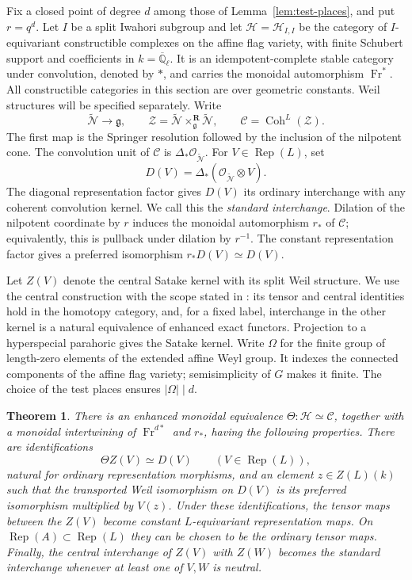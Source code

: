 \documentclass[11pt]{article}
\numberwithin{equation}{section}
\newtheorem{theorem}{Theorem}[section]
\theoremstyle{definition}
\theoremstyle{remark}
\newcommand{\Q}{\mathbb Q}
\newcommand{\g}{\mathfrak g}
\newcommand{\cO}{\mathcal O}
\newcommand{\cN}{\mathcal N}
\newcommand{\Fr}{\operatorname{Fr}}
\newcommand{\Rep}{\operatorname{Rep}}
\newcommand{\Coh}{\operatorname{Coh}}
\begin{document}
Fix a closed point of degree $d$ among those of
Lemma~\ref{lem:test-places}, and put $r=q^d$.
Let $I$ be a split Iwahori subgroup and let
$\mathscr H=\mathscr H_{I,I}$ be the category of $I$-equivariant
constructible complexes on the affine flag variety, with finite
Schubert support and coefficients in $k=\overline{\Q}_\ell$.
It is an idempotent-complete stable category under convolution, denoted
by $*$, and carries the monoidal automorphism $\Fr^*$.
All constructible categories in this section are over geometric
constants.  Weil structures will be specified separately.
Write
\[
 \widetilde{\cN}\longrightarrow\g,
 \qquad
 \mathcal Z=\widetilde{\cN}\mathbin{\times}^{\mathbf R}_{\g}
                     \widetilde{\cN},
 \qquad
 \mathscr C=\Coh^L(\mathcal Z).
\]
The first map is the Springer resolution followed by the inclusion of
the nilpotent cone.  The convolution unit of $\mathscr C$ is
$\Delta_*\cO_{\widetilde{\cN}}$.  For $V\in\Rep(L)$, set
\[
 D(V)=\Delta_*(\cO_{\widetilde{\cN}}\otimes V).
\]
The diagonal representation factor gives $D(V)$ its ordinary
interchange with any coherent convolution kernel.  We call this the
\emph{standard interchange}.  Dilation of the nilpotent coordinate by
$r$ induces the monoidal automorphism $r_*$ of $\mathscr C$; equivalently,
this is pullback under dilation by $r^{-1}$.  The constant representation
factor gives a preferred isomorphism $r_*D(V)\simeq D(V)$.

Let $Z(V)$ denote the central Satake kernel with its split Weil
structure.  We use the central construction with the scope stated in
\cite[Section~2, ``Central and Wakimoto kernels'']{Parent}: its tensor
and central identities hold in the homotopy category, and, for a fixed
label, interchange in the other kernel is a natural equivalence of
enhanced exact functors.  Projection to a hyperspecial parahoric gives
the Satake kernel.  Write $\Omega$ for the finite group of length-zero
elements of the extended affine Weyl group.  It indexes the connected
components of the affine flag variety; semisimplicity of $G$ makes it
finite.  The choice of the test places ensures $|\Omega|\mid d$.

\begin{theorem}\label{thm:enhanced-iwahori}
There is an enhanced monoidal equivalence
$\Theta:\mathscr H\simeq\mathscr C$, together with a monoidal
intertwining of $\Fr^{d*}$ and $r_*$, having the following properties.
There are identifications
\[
 \Theta Z(V)\simeq D(V)\qquad(V\in\Rep(L)),
\]
natural for ordinary representation morphisms, and an element
$z\in Z(L)(k)$ such that the transported Weil isomorphism on $D(V)$ is
its preferred isomorphism multiplied by $V(z)$.
Under these identifications, the tensor maps between the $Z(V)$ become
constant $L$-equivariant representation maps.  On
$\Rep(A)\subset\Rep(L)$ they can be chosen to be the ordinary tensor
maps.  Finally, the central interchange of $Z(V)$ with $Z(W)$ becomes
the standard interchange whenever at least one of $V,W$ is neutral.
\end{theorem}
\end{document}

